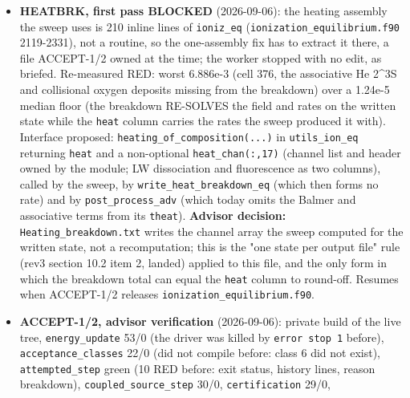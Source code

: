 \documentclass[english,a4paper]{my_memo}
\begin{document}
\begin{itemize}
  \texttt{write\_heat\_breakdown\_eq} (\texttt{util\_ion\_eq.f90} 2280) is a second
  hand-maintained copy of the heating assembly that lacks the new deposit,
  and \texttt{post\_process\_adv.f90} \textasciitilde847 a third: assigned as HEATBRK (one
  assembly, three callers), not the ten-line patch. Advisor verification:
  private build of the live tree, \texttt{coupled\_source\_step} 30/0, \texttt{energy\_update}
  48/0, \texttt{attempted\_step} 31/0, \texttt{certification} 29/0, \texttt{run\_mode} 30/0,
  \texttt{acceptance\_classes} 12/0, \texttt{grid\_and\_gates} 92/1 (the HEATBRK red).
\item
  \textbf{HEATBRK, first pass BLOCKED} (2026-09-06): the heating assembly the
  sweep uses is 210 inline lines of \texttt{ioniz\_eq} (\texttt{ionization\_equilibrium.f90}
  2119-2331), not a routine, so the one-assembly fix has to extract it there,
  a file ACCEPT-1/2 owned at the time; the worker stopped with no edit, as
  briefed. Re-measured RED: worst 6.886e-3 (cell 376, the associative He 2\^{}3S
  and collisional oxygen deposits missing from the breakdown) over a 1.24e-5
  median floor (the breakdown RE-SOLVES the field and rates on the written
  state while the \texttt{heat} column carries the rates the sweep produced it
  with). Interface proposed: \texttt{heating\_of\_composition(...)} in \texttt{utils\_ion\_eq}
  returning \texttt{heat} and a non-optional \texttt{heat\_chan(:,17)} (channel list and
  header owned by the module; LW dissociation and fluorescence as two
  columns), called by the sweep, by \texttt{write\_heat\_breakdown\_eq} (which then
  forms no rate) and by \texttt{post\_process\_adv} (which today omits the Balmer and
  associative terms from its \texttt{theat}). \textbf{Advisor decision:}
  \texttt{Heating\_breakdown.txt} writes the channel array the sweep computed for
  the written state, not a recomputation; this is the "one state per output
  file" rule (rev3 section 10.2 item 2, landed) applied to this file, and
  the only form in which the breakdown total can equal the \texttt{heat} column to
  round-off. Resumes when ACCEPT-1/2 releases \texttt{ionization\_equilibrium.f90}.
\item
  \textbf{ACCEPT-1/2, advisor verification} (2026-09-06): private build of the
  live tree, \texttt{energy\_update} 53/0 (the driver was killed by \texttt{error\ stop\ 1}
  before), \texttt{acceptance\_classes} 22/0 (did not compile before: class 6 did not
  exist), \texttt{attempted\_step} green (10 RED before: exit status, history lines,
  reason breakdown), \texttt{coupled\_source\_step} 30/0, \texttt{certification} 29/0,

\end{itemize}
\end{document}
